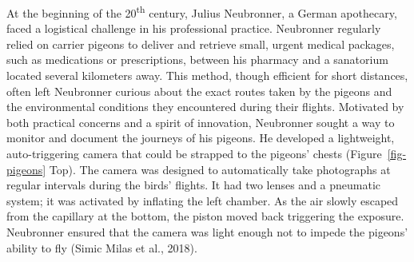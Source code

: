 \documentclass[
  letterpaper,
  11pt,
  english,
  singlespacing,
  headsepline]{MastersDoctoralThesis}
\begin{document}
\begin{spacing}{1.5}
At the beginning of the 20\textsuperscript{th} century, Julius
Neubronner, a German apothecary, faced a logistical challenge in his
professional practice. Neubronner regularly relied on carrier pigeons to
deliver and retrieve small, urgent medical packages, such as medications
or prescriptions, between his pharmacy and a sanatorium located several
kilometers away. This method, though efficient for short distances,
often left Neubronner curious about the exact routes taken by the
pigeons and the environmental conditions they encountered during their
flights. Motivated by both practical concerns and a spirit of
innovation, Neubronner sought a way to monitor and document the journeys
of his pigeons. He developed a lightweight, auto-triggering camera that
could be strapped to the pigeons' chests (Figure~\ref{fig-pigeons} Top).
The camera was designed to automatically take photographs at regular
intervals during the birds' flights. It had two lenses and a pneumatic
system; it was activated by inflating the left chamber. As the air
slowly escaped from the capillary at the bottom, the piston moved back
triggering the exposure. Neubronner ensured that the camera was light
enough not to impede the pigeons' ability to fly (Simic Milas et al.,
2018).

\begin{figure}

\end{figure}
\end{spacing}
\end{document}
